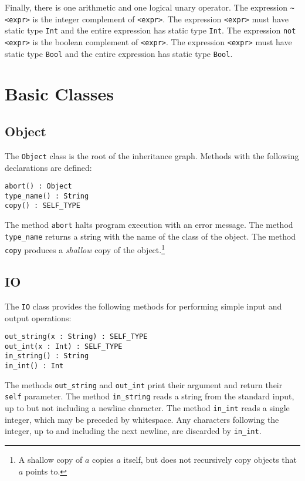 \documentclass[11pt]{article}
\begin{document}

Finally, there is one arithmetic and one logical unary operator.
The expression {\tt \~{ }<expr>} is the integer complement of {\tt <expr>}.
The expression {\tt <expr>} must have static type {\tt Int} and the entire
expression has static type {\tt Int}.
The expression {\tt not <expr>} is the boolean complement of {\tt <expr>}.
The expression {\tt <expr>} must have static type {\tt Bool} and the entire
expression has static type {\tt Bool}.

\section{Basic Classes}
\label{sec-basic}

\subsection{Object}
The {\tt Object} class is the root of the inheritance graph.
Methods with the following declarations are defined:
\begin{verbatim}
abort() : Object
type_name() : String
copy() : SELF_TYPE
\end{verbatim}
The method {\tt abort} halts program execution with an error message.
The method {\tt type\_name} returns a string with the name of the class
of the object.
The method {\tt copy} produces a {\em shallow} copy of the object.\footnote{A shallow copy of $a$ copies $a$ itself, but does not recursively
copy objects that $a$ points to.}

\subsection{IO}
The {\tt IO} class provides the following methods for performing simple input and output
operations:
\begin{verbatim}
out_string(x : String) : SELF_TYPE
out_int(x : Int) : SELF_TYPE
in_string() : String
in_int() : Int
\end{verbatim}
The methods {\tt out\_string} and {\tt out\_int} print their argument and return
their {\tt self} parameter.  The method {\tt in\_string} reads a string from 
the standard input, up to but not including a newline character.  The method
{\tt in\_int} reads a single integer, which may be preceded by whitespace.
Any characters following the integer, up to and including the next newline,
are discarded by {\tt in\_int}.
\end{document}
